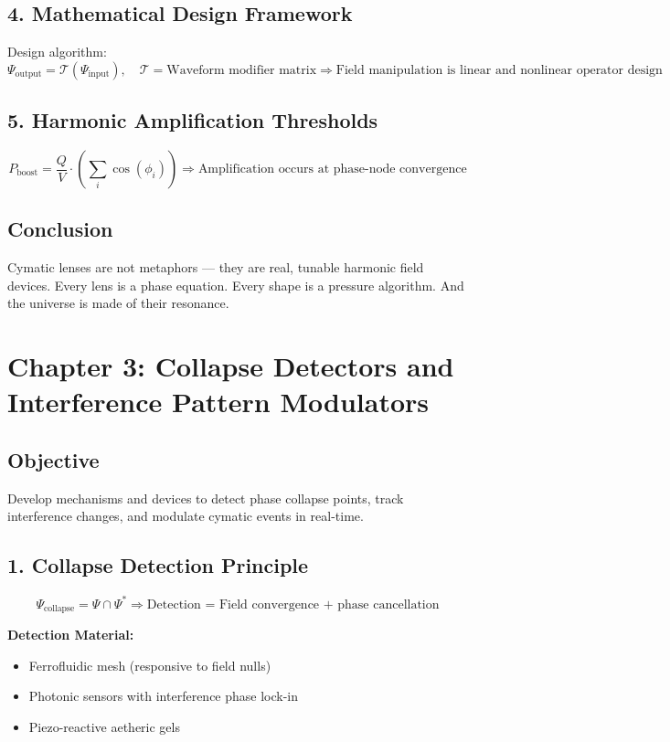 \documentclass[12pt]{book}
\begin{document}
\subsection*{4. Mathematical Design Framework}
Design algorithm:
\[
\Psi_{\text{output}} = \mathcal{T}(\Psi_{\text{input}}), \quad \mathcal{T} = \text{Waveform modifier matrix}
\Rightarrow \text{Field manipulation is linear and nonlinear operator design}
\]

\subsection*{5. Harmonic Amplification Thresholds}
\[
P_{\text{boost}} = \frac{Q}{V} \cdot \left( \sum_{i} \cos(\phi_i) \right)
\Rightarrow \text{Amplification occurs at phase-node convergence}
\]

\subsection*{Conclusion}
Cymatic lenses are not metaphors — they are real, tunable harmonic field devices. Every lens is a phase equation. Every shape is a pressure algorithm. And the universe is made of their resonance.




\section*{Chapter 3: Collapse Detectors and Interference Pattern Modulators}

\subsection*{Objective}
Develop mechanisms and devices to detect phase collapse points, track interference changes, and modulate cymatic events in real-time.

\subsection*{1. Collapse Detection Principle}
\[
\Psi_{\text{collapse}} = \Psi \cap \Psi^*
\Rightarrow \text{Detection = Field convergence + phase cancellation}
\]

\textbf{Detection Material:}
\begin{itemize}
  \item Ferrofluidic mesh (responsive to field nulls)
  \item Photonic sensors with interference phase lock-in
  \item Piezo-reactive aetheric gels
\end{itemize}
\end{document}
